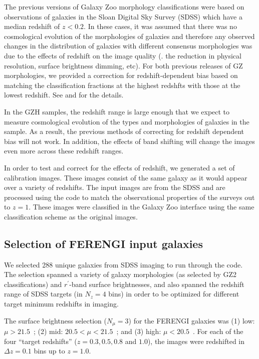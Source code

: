 \documentclass[twocolumn]{aastex6}
\begin{document}
The previous versions of Galaxy Zoo morphology classifications \citep{lin08,wil13} were based on observations of galaxies in the Sloan Digital Sky Survey (SDSS) which have a median redshift of $z<0.2$. In these cases, it was assumed that there was no cosmological evolution of the morphologies of galaxies and therefore any observed changes in the distribution of galaxies with different consensus morphologies was due to the effects of redshift on the image quality (\ie. the reduction in physical resolution, surface brightness dimming, etc). For both previous releases of GZ morphologies, we provided a correction for redshift-dependent bias based on matching the classification fractions at the highest redshfts with those at the lowest redshift. See \citet{bam09} and \citet{wil13} for the details. 

In the GZH samples, the redshift range is large enough that we expect to measure cosmological evolution of the types and morphologies of galaxies in the sample. As a result, the previous methods of correcting for redshift dependent bias will not work. In addition, the effects of band shifting will change the images even more across these redshift ranges. %

In order to test and correct for the effects of redshift, we generated a set of calibration images. These images consist of the same galaxy as it would appear over a variety of redshifts. The input images are from the SDSS \citep{yor00,str02} and are processed using the \ferengi{} code \citep{bar08a} to match the observational properties of the \hst{} surveys out to $z=1$. These images were classified in the Galaxy Zoo interface using the same classification scheme as the original \hst{} images.
 
\subsection{Selection of FERENGI input galaxies}

We selected 288 unique galaxies from SDSS imaging to run through the \ferengi{} code. The selection spanned a variety of galaxy morphologies (as selected by GZ2 classifications) and $r^\prime$-band surface brightnesses, and also spanned the redshift range of SDSS targets (in $N_z = 4$ bins) in order to be optimized for different target minimum redshifts in \hst{} imaging. 

The surface brightness selection ($N_\mu = 3$) for the FERENGI galaxies was (1) low: $\mu > 21.5$~\magarc;  (2) mid: $20.5 < \mu < 21.5$~\magarc; and (3) high: $\mu < 20.5$~\magarc. For each of the four ``target redshifts'' ($z = 0.3, 0.5, 0.8$ and $1.0$), the images were redshifted in $\Delta z = 0.1$ bins up to $z=1.0$. 
 
\end{document}
